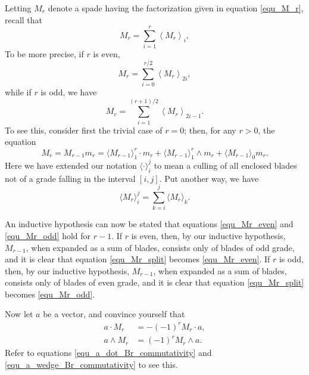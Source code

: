\documentclass{birkjour}
\theoremstyle{definition}
\theoremstyle{remark}
\numberwithin{equation}{section}
\begin{document}
Letting $M_r$ denote a spade having the factorization given in equation \eqref{equ_M_r}, recall that
\begin{equation*}
M_r = \sum_{i=1}^r\left\langle M_r\right\rangle_i,
\end{equation*}
To be more precise, if $r$ is even,
\begin{equation}\label{equ_Mr_even}
M_r = \sum_{i=0}^{r/2}\left\langle M_r\right\rangle_{2i},
\end{equation}
while if $r$ is odd, we have
\begin{equation}\label{equ_Mr_odd}
M_r = \sum_{i=1}^{(r+1)/2}\left\langle M_r\right\rangle_{2i-1}.
\end{equation}
To see this, consider first the trivial case of $r=0$; then, for any $r>0$, the equation
\begin{equation}\label{equ_Mr_split}
M_r = M_{r-1}m_r = \langle M_{r-1}\rangle_1^r\cdot m_r + \langle M_{r-1}\rangle_1^r\wedge m_r + \langle M_{r-1}\rangle_0 m_r.
\end{equation}
Here we have extended our notation $\langle\cdot\rangle_i^j$ to mean a culling of all enclosed blades not of a grade falling
in the interval $[i,j]$.  Put another way, we have
\begin{equation*}
\langle M_r\rangle_i^j = \sum_{k=i}^j\langle M_r\rangle_k.
\end{equation*}

An inductive hypothesis can now be stated that equations \eqref{equ_Mr_even} and \eqref{equ_Mr_odd} hold for $r-1$.
If $r$ is even, then, by our inductive hypothesis, $M_{r-1}$, when expanded as a sum of blades, consists only of blades of odd grade,
and it is clear that equation \eqref{equ_Mr_split} becomes \eqref{equ_Mr_even}.  If $r$ is odd, then, by our inductive hypothesis, $M_{r-1}$, when expanded as
a sum of blades, consists only of blades of even grade, and it is clear that equation \eqref{equ_Mr_split} becomes \eqref{equ_Mr_odd}.

Now let $a$ be a vector, and convince yourself that
\begin{align}
a\cdot M_r &= -(-1)^r M_r\cdot a,\label{equ_a_dot_Mr_commutativity} \\
a\wedge M_r &= (-1)^r M_r\wedge a.\label{equ_a_wedge_Mr_commutativity}
\end{align}
Refer to equations \eqref{equ_a_dot_Br_commutativity} and \eqref{equ_a_wedge_Br_commutativity} to see this.
\end{document}
